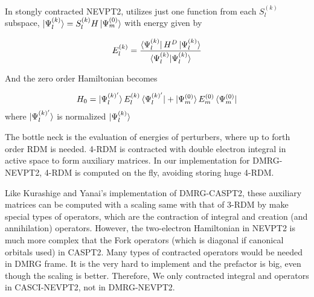 In stongly contracted NEVPT2, utilizes just one function from each $S_l^{(k)}$ subspace, $\ket{\Psi^{(k)}_l} = S^{(k)}_l H \ket{\Psi^{(0)}_m}$ with energy given by

\begin{equation}
  E^{(k)}_l = \frac{\bra{\Psi^{(k)}_l}H^D\ket{\Psi^{(k)}_l}}{\braket{\Psi^{(k)}_l|\Psi^{(k)}_l}}
\end{equation}

And the zero order Hamiltonian becomes

\begin{equation}
  H_0 = \ket{\Psi^{(k)'}_l}E^{(k)}_l \bra{\Psi^{(k)'}_l} +\ket{\Psi^{(0)}_m}E^{(0)}_m \bra{\Psi^{(0)}_m}
\end{equation}
where $\ket{\Psi^{(k)'}_l}$ is normalized $\ket{\Psi^{(k)}_l}$


The bottle neck is the evaluation of energies of perturbers, where up to forth order RDM is needed. 4-RDM is contracted with double electron integral in active space to form auxiliary matrices. In our implementation for DMRG-NEVPT2, 4-RDM is computed on the fly, avoiding storing huge 4-RDM.


Like Kurashige and Yanai's implementation of DMRG-CASPT2\cite{kurashige_second-order_2011}, these auxiliary matrices can be computed with a scaling same with that of 3-RDM by make special types of operators, which are the contraction of integral and creation (and annihilation) operators. However, the two-electron Hamiltonian in NEVPT2 is much more complex that the Fork operators (which is diagonal if canonical orbitals used) in CASPT2. Many types of contracted operators would be needed in DMRG frame. It is the very hard to implement and the prefactor is big, even though the scaling is better. Therefore, We only contracted integral and operators in CASCI-NEVPT2, not in DMRG-NEVPT2.



